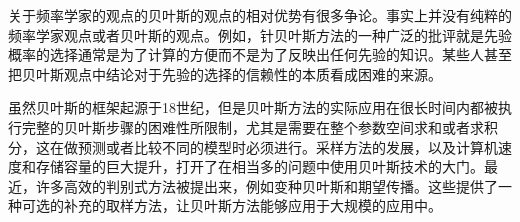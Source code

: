 关于频率学家的观点的贝叶斯的观点的相对优势有很多争论。事实上并没有纯粹的频率学家观点或者贝叶斯的观点。例如，针贝叶斯方法的一种广泛的批评就是先验概率的选择通常是为了计算的方便而不是为了反映出任何先验的知识。某些人甚至把贝叶斯观点中结论对于先验的选择的信赖性的本质看成困难的来源。

虽然贝叶斯的框架起源于18世纪，但是贝叶斯方法的实际应用在很长时间内都被执行完整的贝叶斯步骤的困难性所限制，尤其是需要在整个参数空间求和或者求积分，这在做预测或者比较不同的模型时必须进行。采样方法的发展，以及计算机速度和存储容量的巨大提升，打开了在相当多的问题中使用贝叶斯技术的大门。最近，许多高效的判别式方法被提出来，例如变种贝叶斯和期望传播。这些提供了一种可选的补充的取样方法，让贝叶斯方法能够应用于大规模的应用中。